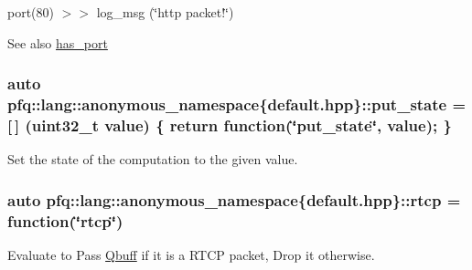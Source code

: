 port(80) $>$$>$ log\+\_\+msg (\char`\"{}http packet!\char`\"{})

\begin{DoxySeeAlso}{See also}
\hyperlink{namespacepfq_1_1lang_1_1anonymous__namespace_02default_8hpp_03_a9f7161b8dfb842c5a845f413eb6bc82f}{has\+\_\+port} 
\end{DoxySeeAlso}
\subsubsection[{\texorpdfstring{put\+\_\+state}{put_state}}]{\setlength{\rightskip}{0pt plus 5cm}auto pfq\+::lang\+::anonymous\+\_\+namespace\{default.\+hpp\}\+::put\+\_\+state = \mbox{[}$\,$\mbox{]} (uint32\+\_\+t value) \{ return {\bf function}(\char`\"{}put\+\_\+state\char`\"{}, value); \}}\hypertarget{namespacepfq_1_1lang_1_1anonymous__namespace_02default_8hpp_03_afd94f51db878b2f70225c944c3f1d300}{}\label{namespacepfq_1_1lang_1_1anonymous__namespace_02default_8hpp_03_afd94f51db878b2f70225c944c3f1d300}


Set the state of the computation to the given value. 

\subsubsection[{\texorpdfstring{rtcp}{rtcp}}]{\setlength{\rightskip}{0pt plus 5cm}auto pfq\+::lang\+::anonymous\+\_\+namespace\{default.\+hpp\}\+::rtcp = {\bf function}(\char`\"{}rtcp\char`\"{})}\hypertarget{namespacepfq_1_1lang_1_1anonymous__namespace_02default_8hpp_03_ad16ac0dfb9ae7abc1db76ab8041bada3}{}\label{namespacepfq_1_1lang_1_1anonymous__namespace_02default_8hpp_03_ad16ac0dfb9ae7abc1db76ab8041bada3}


Evaluate to {\ttfamily Pass} \hyperlink{structpfq_1_1lang_1_1Qbuff}{Qbuff} if it is a R\+T\+CP packet, {\ttfamily Drop} it otherwise. 

